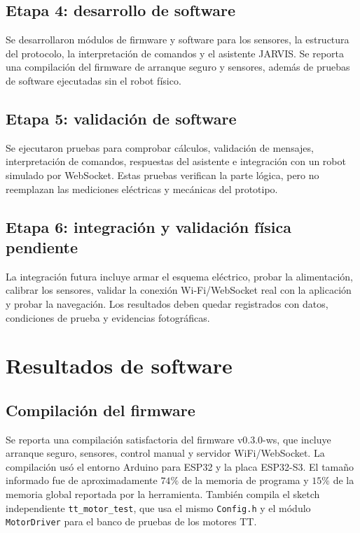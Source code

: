 \documentclass[journal]{IEEEtran}
\begin{document}
\subsection{Etapa 4: desarrollo de software}

Se desarrollaron módulos de firmware y software para los sensores, la estructura del protocolo, la interpretación de comandos y el asistente JARVIS. Se reporta una compilación del firmware de arranque seguro y sensores, además de pruebas de software ejecutadas sin el robot físico.

\subsection{Etapa 5: validación de software}

Se ejecutaron pruebas para comprobar cálculos, validación de mensajes, interpretación de comandos, respuestas del asistente e integración con un robot simulado por WebSocket. Estas pruebas verifican la parte lógica, pero no reemplazan las mediciones eléctricas y mecánicas del prototipo.

\subsection{Etapa 6: integración y validación física pendiente}

La integración futura incluye armar el esquema eléctrico, probar la alimentación, calibrar los sensores, validar la conexión Wi-Fi/WebSocket real con la aplicación y probar la navegación. Los resultados deben quedar registrados con datos, condiciones de prueba y evidencias fotográficas.


\section{Resultados de software}

\subsection{Compilación del firmware}

Se reporta una compilación satisfactoria del firmware v0.3.0-ws, que incluye arranque seguro, sensores, control manual y servidor WiFi/WebSocket. La compilación usó el entorno Arduino para ESP32 y la placa ESP32-S3. El tamaño informado fue de aproximadamente $74\%$ de la memoria de programa y $15\%$ de la memoria global reportada por la herramienta. También compila el sketch independiente \texttt{tt\_motor\_test}, que usa el mismo \texttt{Config.h} y el módulo \texttt{MotorDriver} para el banco de pruebas de los motores TT.
\end{document}
